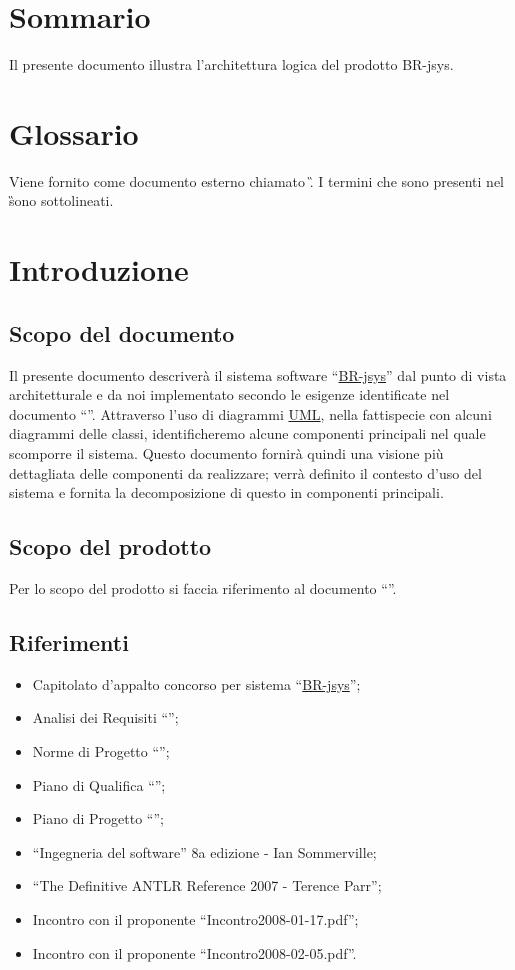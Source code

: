 \newpage

\tableofcontents
\chapter*{Sommario}
Il presente documento illustra l'architettura logica del prodotto BR-jsys.

\chapter*{Glossario}
Viene fornito come documento esterno chiamato \G . I termini che sono presenti nel \G sono sottolineati.

\chapter{Introduzione}
\section{Scopo del documento}
Il presente documento descriver\`a il sistema software ``\underline{BR-jsys}'' dal punto di vista architetturale e da noi implementato secondo le esigenze identificate nel documento ``\AR''. Attraverso l'uso di diagrammi \underline{UML}, nella fattispecie con alcuni diagrammi delle classi, identificheremo alcune componenti principali nel quale scomporre il sistema. Questo documento fornir\`a quindi una visione pi\`u dettagliata delle componenti da realizzare; verr\`a definito il contesto d'uso del sistema e fornita la decomposizione di questo in componenti principali.
\section{Scopo del prodotto}
Per lo scopo del prodotto si faccia riferimento al documento ``\AR''.

\section{Riferimenti}
\begin{itemize}
\item Capitolato d'appalto concorso per sistema ``\underline{BR-jsys}'';
\item Analisi dei Requisiti ``\AR'';
\item Norme di Progetto ``\NdP'';
\item Piano di Qualifica ``\PdQ'';
\item Piano di Progetto ``\PdP'';
\item ``Ingegneria del software'' 8a edizione - Ian Sommerville;
\item ``The Definitive ANTLR Reference 2007 - Terence Parr'';
\item Incontro con il proponente ``Incontro2008-01-17.pdf'';
\item Incontro con il proponente ``Incontro2008-02-05.pdf''.
\end{itemize}


